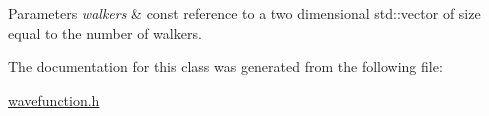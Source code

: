 \begin{DoxyParams}{Parameters}
{\em walkers} & const reference to a two dimensional std\+::vector of size equal to the number of walkers. \\
\hline
\end{DoxyParams}


The documentation for this class was generated from the following file\+:\begin{DoxyCompactItemize}
\item 
\hyperlink{wavefunction_8h}{wavefunction.\+h}\end{DoxyCompactItemize}
